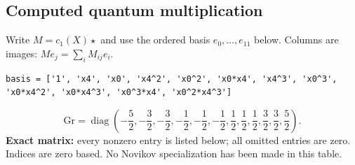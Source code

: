 \documentclass[10pt,a4paper]{article}
\begin{document}
\subsection*{Computed quantum multiplication}
Write $M=c_1(X)\star$ and use the ordered basis $e_0,\ldots,e_{11}$ below. Columns are images: $M e_j=\sum_i M_{ij}e_i$.
\begin{lstlisting}
basis = ['1', 'x4', 'x0', 'x4^2', 'x0^2', 'x0*x4', 'x4^3', 'x0^3', 'x0*x4^2', 'x0*x4^3', 'x0^3*x4', 'x0^2*x4^3']
\end{lstlisting}
\[\mathrm{Gr}=\operatorname{diag}\!\left(- \frac{5}{2},- \frac{3}{2},- \frac{3}{2},- \frac{1}{2},- \frac{1}{2},- \frac{1}{2},\frac{1}{2},\frac{1}{2},\frac{1}{2},\frac{3}{2},\frac{3}{2},\frac{5}{2}\right).\]
\textbf{Exact matrix:} every nonzero entry is listed below; all omitted entries are zero. Indices are zero based. No Novikov specialization has been made in this table.
\end{document}
